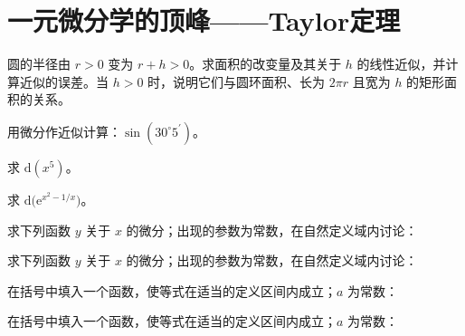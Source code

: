 \renewcommand{\thesection}{\arabic{section}}\renewcommand{\theHsection}{chapter.\arabic{section}}\setcounter{section}{3}\section{一元微分学的顶峰——Taylor定理}
\noindent\begin{minipage}{\textwidth}
圆的半径由 $r>0$ 变为 $r+h>0$。求面积的改变量及其关于 $h$ 的线性近似，并计算近似的误差。当 $h>0$ 时，说明它们与圆环面积、长为 $2\pi r$ 且宽为 $h$ 的矩形面积的关系。
\end{minipage}\par\vfill
\noindent\begin{minipage}{\textwidth}
用微分作近似计算：$\sin(30^\circ5^{\prime})$。
\end{minipage}\par\vfill
\noindent\begin{minipage}{\textwidth}
求 $\mathrm d(x^5)$。
\end{minipage}\par\vfill
\newpage
\noindent\begin{minipage}{\textwidth}
求 $\mathrm d\bigl(\mathrm e^{x^2-1/x}\bigr)$。
\end{minipage}\par\vfill
\noindent\begin{minipage}{\textwidth}
求下列函数 $y$ 关于 $x$ 的微分；出现的参数为常数，在自然定义域内讨论：
\end{minipage}\par\vfill
\noindent\begin{minipage}{\textwidth}
求下列函数 $y$ 关于 $x$ 的微分；出现的参数为常数，在自然定义域内讨论：
\end{minipage}\par\vfill
\newpage
\noindent\begin{minipage}{\textwidth}
在括号中填入一个函数，使等式在适当的定义区间内成立；$a$ 为常数：
\end{minipage}\par\vfill
\noindent\begin{minipage}{\textwidth}
在括号中填入一个函数，使等式在适当的定义区间内成立；$a$ 为常数：
\end{minipage}\par\vfill
